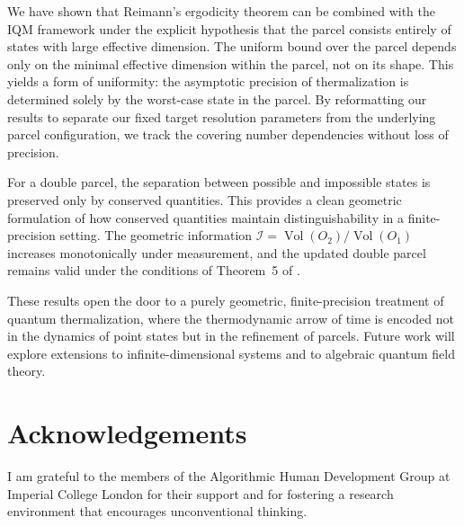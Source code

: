 \documentclass[11pt, onecolumn]{article}
\begin{document}
We have shown that Reimann's ergodicity theorem can be combined with the IQM framework under the explicit hypothesis that the parcel consists entirely of states with large effective dimension. The uniform bound over the parcel depends only on the minimal effective dimension within the parcel, not on its shape. This yields a form of uniformity: the asymptotic precision of thermalization is determined solely by the worst-case state in the parcel. By reformatting our results to separate our fixed target resolution parameters from the underlying parcel configuration, we track the covering number dependencies without loss of precision.

For a double parcel, the separation between possible and impossible states is preserved only by conserved quantities. This provides a clean geometric formulation of how conserved quantities maintain distinguishability in a finite-precision setting. The geometric information \(\mathcal{I}=\operatorname{Vol}(O_2)/\operatorname{Vol}(O_1)\) increases monotonically under measurement, and the updated double parcel remains valid under the conditions of Theorem~5 of \cite{Edalat2026}.

These results open the door to a purely geometric, finite-precision treatment of quantum thermalization, where the thermodynamic arrow of time is encoded not in the dynamics of point states but in the refinement of parcels. Future work will explore extensions to infinite-dimensional systems and to algebraic quantum field theory.

\section*{Acknowledgements}
I am grateful to the members of the Algorithmic Human Development Group at Imperial College London for their support and for fostering a research environment that encourages unconventional thinking.
\end{document}
